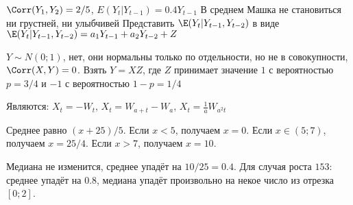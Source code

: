 \begin{solution}{13.4}
\end{solution}
\begin{solution}{13.5}
  $\Corr(Y_1, Y_2) = 2/5$, $E(Y_t | Y_{t-1}) = 0.4 Y_{t-1}$
  В среднем Машка не становиться ни грустней, ни улыбчивей
  Представить $\E(Y_t | Y_{t-1}, Y_{t-2})$ в виде $\E(Y_t | Y_{t-1}, Y_{t-2}) = a_1 Y_{t-1} + a_2 Y_{t-2} + Z$
\end{solution}
\begin{solution}{13.6}
\end{solution}
\begin{solution}{13.7}
\end{solution}
\begin{solution}{13.8}
\end{solution}
\begin{solution}{13.9}
\end{solution}
\begin{solution}{13.10}
  $Y \sim N(0;1)$, нет, они нормальны только по отдельности, но не в совокупности, $\Corr(X,Y)=0$. Взять $Y=XZ$, где $Z$ принимает значение $1$ с вероятностью $p=3/4$ и $-1$ с вероятностью $1-p=1/4$
\end{solution}
\begin{solution}{14.1}
\end{solution}
\begin{solution}{14.2}
\end{solution}
\begin{solution}{14.3}
Являются: $X_{t}=-W_{t}$, $X_{t}=W_{a+t}-W_{a}$, $X_{t}=\frac{1}{a}W_{a^{2}t}$
\end{solution}
\begin{solution}{14.4}
\end{solution}
\begin{solution}{14.5}
\end{solution}
\begin{solution}{15.1}
Среднее равно $(x+25)/5$. Если $x<5$, получаем $x=0$. Если $x \in (5; 7)$, получаем $x=25/4$. Если $x>7$, получаем $x=10$.
\end{solution}
\begin{solution}{15.2}
Медиана не изменится, среднее упадёт на $10/25=0.4$. Для случая роста $153$: среднее упадёт на $0.8$, медиана упадёт произвольно на некое число из отрезка $[0;2]$.
\end{solution}
\begin{solution}{15.3}
\end{solution}
\begin{solution}{15.4}
\end{solution}

